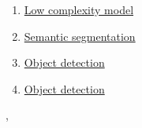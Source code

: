 \documentclass[11pt]{article}
\renewcommand{\today}{\shortmonthname[\the\month] \the \day,  \the\year}
\begin{document}
\begin{multicols}{2}
\begin{enumerate}
		\item \href{https://mp.weixin.qq.com/s/mZ99kdR5l0qdor4GWWZCfw}{Low complexity model }	%
		\item \href{https://mp.weixin.qq.com/s/HC3-nTfMKld3DknRtWcWSw}{Semantic segmentation}	%
		\item \href{https://mp.weixin.qq.com/s/XlJpUAgo-ikHVHbmWkOosA}{Object detection }	%
		\item \href{https://mp.weixin.qq.com/s/kSiRl13zjIFntswEbNBDFQ}{Object detection }	%
	\end{enumerate}
\end{multicols}





%
\begin{flushright}
	\tiny \today 
\end{flushright}
\end{document}
